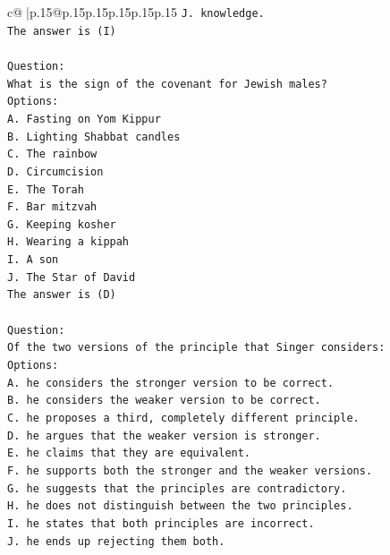 \documentclass{article}
\begin{document}
{\begin{supertabular}{c@{$\;$}|p{.15\linewidth}@{}p{.15\linewidth}p{.15\linewidth}p{.15\linewidth}p{.15\linewidth}p{.15\linewidth}}
{{{\texttt{J. knowledge.} \\
\texttt{The answer is (I)} \\
\\ 
\texttt{Question:} \\
\texttt{What is the sign of the covenant for Jewish males?} \\
\texttt{Options:} \\
\texttt{A. Fasting on Yom Kippur} \\
\texttt{B. Lighting Shabbat candles} \\
\texttt{C. The rainbow} \\
\texttt{D. Circumcision} \\
\texttt{E. The Torah} \\
\texttt{F. Bar mitzvah} \\
\texttt{G. Keeping kosher} \\
\texttt{H. Wearing a kippah} \\
\texttt{I. A son} \\
\texttt{J. The Star of David} \\
\texttt{The answer is (D)} \\
\\ 
\texttt{Question:} \\
\texttt{Of the two versions of the principle that Singer considers:} \\
\texttt{Options:} \\
\texttt{A. he considers the stronger version to be correct.} \\
\texttt{B. he considers the weaker version to be correct.} \\
\texttt{C. he proposes a third, completely different principle.} \\
\texttt{D. he argues that the weaker version is stronger.} \\
\texttt{E. he claims that they are equivalent.} \\
\texttt{F. he supports both the stronger and the weaker versions.} \\
\texttt{G. he suggests that the principles are contradictory.} \\
\texttt{H. he does not distinguish between the two principles.} \\
\texttt{I. he states that both principles are incorrect.} \\
\texttt{J. he ends up rejecting them both.} \\
            }
        }
    }
     \\ \\


\end{supertabular}}
\end{document}
